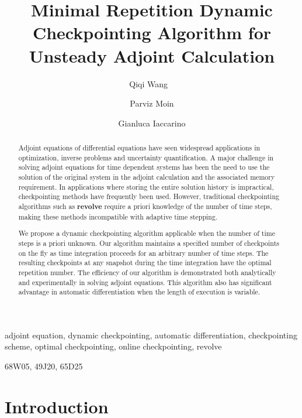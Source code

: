 \documentclass[oneeqnum, onethmnum, onefignum, onetabnum]{siamltex}
\title{Minimal Repetition Dynamic Checkpointing Algorithm for Unsteady Adjoint
       Calculation}
\author{Qiqi Wang \footnotemark[1]\ \footnotemark[2]
\and Parviz Moin \footnotemark[2]
\and Gianluca Iaccarino \footnotemark[2]
}
\begin{document}
\maketitle

\renewcommand{\thefootnote}{\fnsymbol{footnote}}
\renewcommand{\thefootnote}{\arabic{footnote}}

\begin{abstract}
Adjoint equations of differential equations have seen widespread
applications in optimization, inverse problems and uncertainty quantification.
A major challenge in solving adjoint equations for time dependent systems has
been the need to use the solution of the original system in the adjoint
calculation and the associated memory requirement.  In applications where
storing the entire solution history is impractical, checkpointing methods have
frequently been used.  However, traditional checkpointing algorithms
such as {\bf revolve} require a priori knowledge of the
number of time steps, making these methods incompatible with adaptive time
stepping.

We propose a dynamic checkpointing algorithm applicable when the number of time
steps is a priori unknown.  Our algorithm maintains a specified number of
checkpoints on the fly as time integration proceeds for an arbitrary number of
time steps.  The resulting checkpoints at any snapshot during the time
integration have the optimal repetition number.  The efficiency of our
algorithm is demonstrated both analytically and experimentally in solving
adjoint equations.  This algorithm also has significant advantage in
automatic differentiation when the length of execution is variable.
\end{abstract}

\begin{keywords}
adjoint equation, dynamic checkpointing,
automatic differentiation, checkpointing scheme,
optimal checkpointing, online checkpointing, revolve
\end{keywords}

\begin{AMS}
68W05, 49J20, 65D25
\end{AMS}

\pagestyle{myheadings}
\thispagestyle{plain}

\section{Introduction}
\end{document}
